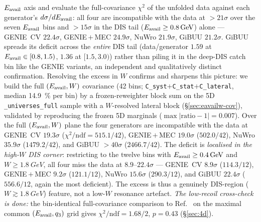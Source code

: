 \begin{enumerate}
        $E_{\mathrm{avail}}$ axis and evaluate the full-covariance $\chi^{2}$ of the unfolded
        data against each generator's $d\sigma/dE_{\mathrm{avail}}$: all four are incompatible
        with the data at $>21\sigma$ over the seven $E_{\mathrm{avail}}$ bins and $>15\sigma$ in
        the DIS tail ($E_{\mathrm{avail}}\ge\SI{0.8}{GeV}$) alone --- GENIE~CV $22.4\sigma$,
        GENIE\,$+$\,MEC $24.9\sigma$, NuWro $21.9\sigma$, GiBUU $21.2\sigma$. GiBUU
        spreads its deficit across the \emph{entire} DIS tail (data/generator
        $1.59$ at $E_{\mathrm{avail}}\in[0.8,1.5)$, $1.36$ at $[1.5,3.0)$) rather than piling
        it in the deep-DIS catch bin like the GENIE variants, an independent and
        qualitatively distinct confirmation. Resolving the excess in $W$ confirms
        and sharpens this picture: we build the full $(E_{\mathrm{avail}},W)$ covariance
        (42 bins; \texttt{C\_syst}$+$\texttt{C\_stat}$+$\texttt{C\_lateral}, median
        \SI{14.9}{\percent} per bin) by a frozen-reweighter block sum on the 5D
        \texttt{\_universes\_full} sample with a $W$-resolved lateral block
        (\S\ref{sec:eavailw-cov}), validated by reproducing the frozen 5D
        marginals ($\max|\text{ratio}-1|=0.007$). Over the full $(E_{\mathrm{avail}},W)$ plane
        the four generators are incompatible with the data at GENIE~CV $19.3\sigma$
        ($\chi^{2}/\mathrm{ndf}=515.1/42$), GENIE\,$+$\,MEC $19.0\sigma$ ($502.0/42$),
        NuWro $35.9\sigma$ ($1479.2/42$), and GiBUU $>40\sigma$ ($2466.7/42$). The
        deficit is \emph{localised in the high-$W$ DIS corner}: restricting to the
        twelve bins with $E_{\mathrm{avail}}\ge\SI{0.4}{GeV}$ and $W\ge\SI{1.8}{GeV}$, all four
        miss the data at $8.9$--$22.4\sigma$ --- GENIE~CV $8.9\sigma$ ($114.3/12$),
        GENIE\,$+$\,MEC $9.2\sigma$ ($121.1/12$), NuWro $15.6\sigma$ ($290.3/12$), and
        GiBUU $22.4\sigma$ ($556.6/12$, again the most deficient). The excess is thus
        a genuinely DIS-region ($W\gtrsim\SI{1.8}{GeV}$) feature, not a low-$W$
        resonance artefact. \emph{The low-recoil cross-check is done:} the
        bin-identical full-covariance comparison to
        Ref.~\cite{MINERvA:2022incl} on the maximal common $(E_{\mathrm{avail}},q_{3})$
        grid gives $\chi^{2}/\mathrm{ndf}=1.68/2$, $p=0.43$ (\S\ref{sec:4d}).
\end{enumerate}

